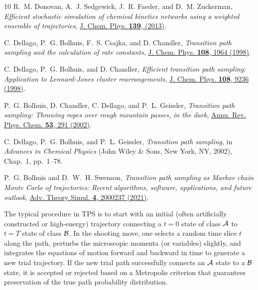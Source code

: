 \documentclass[english,10pt,aps,pra,twocolumn,superscriptaddress,floatfix,fleqn]{revtex4-2}
\begin{document}
\begin{thebibliography}{10}
R.~M. Donovan, A.~J. Sedgewick, J.~R. Faeder, and D.~M. Zuckerman, {\em
  Efficient stochastic simulation of chemical kinetics networks using a
  weighted ensemble of trajectories},
  \href{http://dx.doi.org/10.1063/1.4821167} {J. Chem. Phys. {\bf 139},
  (2013)}.

C. Dellago, P.~G. Bolhuis, F.~S. Csajka, and D. Chandler, {\em Transition path
  sampling and the calculation of rate constants},
  \href{http://dx.doi.org/10.1063/1.475562} {J. Chem. Phys. {\bf 108},  1964
  (1998)}.

C. Dellago, P.~G. Bolhuis, and D. Chandler, {\em Efficient transition path
  sampling: Application to Lennard-Jones cluster rearrangements},
  \href{http://dx.doi.org/10.1063/1.476378} {J. Chem. Phys. {\bf 108},  9236
  (1998)}.

P.~G. Bolhuis, D. Chandler, C. Dellago, and P.~L. Geissler, {\em Transition
  path sampling: Throwing ropes over rough mountain passes, in the dark},
  \href{http://dx.doi.org/10.1146/annurev.physchem.53.082301.113146} {Annu.
  Rev. Phys. Chem. {\bf 53},  291  (2002)}.

C. Dellago, P.~G. Bolhuis, and P.~L. Geissler, {\em Transition path sampling},
  in {\em Advances in Chemical Physics} (John Wiley \& Sons, New York, NY,
  2002), Chap.~1, pp.\ 1--78.

P.~G. Bolhuis and D.~W.~H. Swenson, {\em Transition path sampling as Markov
  chain Monte Carlo of trajectories: Recent algorithms, software, applications,
  and future outlook}, \href{http://dx.doi.org/10.1002/adts.202000237} {Adv.
  Theory Simul. {\bf 4},  2000237  (2021)}.

The typical procedure in TPS is to start with an initial (often artificially
  constructed or high-energy) trajectory connecting a $t=0$ state of class
  $\protect \mathcal {A}$ to $t=T$ state of class $\protect \mathcal {B}$. In
  the shooting move, one selects a random time slice $t$ along the path,
  perturbs the microscopic momenta (or variables) slightly, and integrates the
  equations of motion forward and backward in time to generate a new trial
  trajectory. If the new trial path successfully connects an $\protect \mathcal
  {A}$ state to a $\protect \mathcal {B}$ state, it is accepted or rejected
  based on a Metropolis criterion that guarantees preservation of the true path
  probability distribution.


\end{thebibliography}
\end{document}
